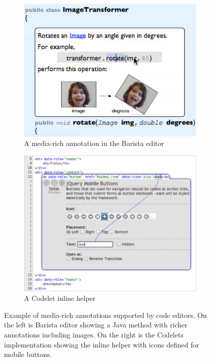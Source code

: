 \begin{figure}
\centering
\begin{subfigure}{.5\textwidth}
  \centering
  \includegraphics[width=.7\linewidth]{images/barista}
  \caption{A media-rich annotation in the Barista editor}
  \label{fig:barista}
\end{subfigure}%
\begin{subfigure}{.5\textwidth}
  \centering
  \includegraphics[width=.7\linewidth]{images/codelet}
  \caption{A Codelet inline helper}
  \label{fig:codelet}
\end{subfigure}
\caption{Example of media-rich annotations supported by code editors. On the left is Barista editor showing a Java method with richer annotations including images. On the right is the Codelets implementation showing the inline helper with icons defined for mobile buttons.}
\label{fig:richmedia}
\end{figure}

